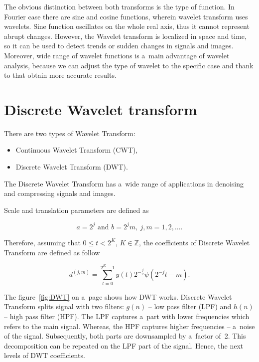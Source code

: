The obvious distinction between both transforms is the type of function. In Fourier case there are sine and cosine functions, wherein wavelet transform uses wavelets. Sine function oscillates on the whole real axis, thus it cannot represent abrupt changes. However, the Wavelet transform is localized in space and time, so it can be used to detect trends or sudden changes in signals and images. Moreover, wide range of wavelet functions is a~main advantage of wavelet analysis, because we can adjust the type of wavelet to the specific case and thank to that obtain more accurate results.

\section{Discrete Wavelet transform}

There are two types of Wavelet Transform:
\begin{itemize}
	\item Continuous Wavelet Transform (CWT),
	\item Discrete Wavelet Transform (DWT).
\end{itemize}

The Discrete Wavelet Transform has a~wide range of applications in denoising and compressing signals and images.

Scale and translation parameters are defined as

\begin{equation}
a = 2^j \text{ and } b = 2^j m,\ j,m=1,2,\ldots.
\end{equation}

Therefore, assuming that $0 \leq t < 2^K$, $K \in \mathbb{Z}$, the coefficients of Discrete Wavelet Transform are defined as follow

\begin{equation}
d^{(j,m)}=\sum_{t=0}^{2^K -1} y(t) 2^{-\frac{j}{2}} \psi\left(2^{-j}t - m\right).
\end{equation}

The figure~\ref{fig:DWT} on a~page \pageref{fig:DWT} shows how DWT works. Discrete Wavelet Transform splits signal with two filters: $g(n)$ -- low pass filter (LPF) and $h(n)$ -- high pass filter (HPF). The LPF captures a~part with lower frequencies which refers to the main signal. Whereas, the HPF captures higher frequencies -- a~noise of the signal. Subsequently, both parts are downsampled by a~factor of~2. This decomposition can be repeated on the LPF part of the signal. Hence, the next levels of DWT coefficients.


